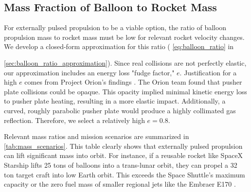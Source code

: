 \documentclass{article}
\begin{document}
\subsection{Mass Fraction of Balloon to Rocket Mass}
For externally pulsed propulsion to be a viable option, the ratio of balloon propulsion mass to rocket mass must be low for relevant rocket velocity changes. We develop a closed-form approximation for this ratio ( \autoref{eq:balloon_ratio} in {\autoref{sec:balloon_ratio_approximation}). Since real collisions are not perfectly elastic, our approximation includes an energy loss "fudge factor," \(e\).  Justification for a high \(e\) comes from Project Orion's findings \cite{orion_reflections}.   The Orion team found that pusher plate collisions could be opaque. This opacity implied minimal kinetic energy loss to pusher plate heating, resulting in a more elastic impact. Additionally, a curved, roughly parabolic pusher plate would produce a  highly collimated gas reflection. Therefore, we select a relatively high  \(e=0.8\).   

Relevant mass ratios and mission scenarios are summarized in \autoref{tab:mass_scenarios}. This table clearly shows that externally pulsed propulsion can lift significant mass into orbit. For instance, if a reusable rocket like SpaceX Starship \cite{starship} lifts 25 tons of balloons into a trans-lunar orbit, they can propel a 32 ton target craft into low Earth orbit. This exceeds the Space Shuttle's maximum capacity \cite{space_shuttle_program} or the zero fuel mass of smaller regional jets like the Embraer E170 \cite{embraer_e170}.

}
\end{document}
